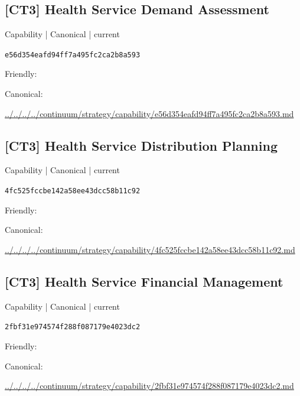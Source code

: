 \documentclass[10pt,a4paper]{article}
\begin{document}
\subsection*{[CT3] Health Service Demand Assessment}
{\small Capability | Canonical | current}\par
\texttt{e56d354eafd94ff7a495fc2ca2b8a593}\par
Friendly: \par
Canonical: \par
{\footnotesize\url{../../../../continuum/strategy/capability/e56d354eafd94ff7a495fc2ca2b8a593.md}}\par
\subsection*{[CT3] Health Service Distribution Planning}
{\small Capability | Canonical | current}\par
\texttt{4fc525fccbe142a58ee43dcc58b11c92}\par
Friendly: \par
Canonical: \par
{\footnotesize\url{../../../../continuum/strategy/capability/4fc525fccbe142a58ee43dcc58b11c92.md}}\par
\subsection*{[CT3] Health Service Financial Management}
{\small Capability | Canonical | current}\par
\texttt{2fbf31e974574f288f087179e4023dc2}\par
Friendly: \par
Canonical: \par
{\footnotesize\url{../../../../continuum/strategy/capability/2fbf31e974574f288f087179e4023dc2.md}}\par
\end{document}
